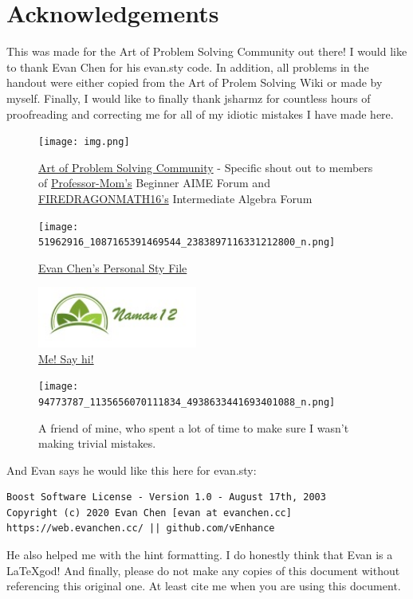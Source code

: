 \documentclass[11pt,titlepage]{scrartcl}
\begin{document}
\section{Acknowledgements}
This was made for the Art of Problem Solving Community out there! I would like to thank Evan Chen for his evan.sty code. In addition, all problems in the handout were either copied from the Art of Prolem Solving Wiki or made by myself. Finally, I would like to finally thank jsharmz for countless hours of proofreading and correcting me for all of my idiotic mistakes I have made here.
\begin{figure}[H]
    \centering
    \texttt{[image: img.png]}
    \caption*{\href{https://artofproblemsolving.com/community}{Art of Problem Solving Community} - Specific shout out to members of \href{https://artofproblemsolving.com/community/user/282934}{Professor-Mom's} Beginner AIME Forum and \href{https://artofproblemsolving.com/community/user/401703}{FIREDRAGONMATH16's} Intermediate Algebra Forum}
\end{figure}
\begin{figure}[H]
    \centering
    \texttt{[image: 51962916\_1087165391469544\_2383897116331212800\_n.png]}
    \caption*{\href{https://github.com/vEnhance/dotfiles/blob/master/texmf/tex/latex/evan/evan.sty}{Evan Chen's Personal Sty File}}
\end{figure}
\begin{figure}[H]
    \centering
    \includegraphics[height=20mm]{image000000.png.jpeg}
    \caption*{\href{https://realnaman12.github.io}{Me! Say hi!}}
\end{figure}
\begin{figure}[H]
    \centering
    \texttt{[image: 94773787\_1135656070111834\_4938633441693401088\_n.png]}
    \caption*{A friend of mine, who spent a lot of time to make sure I wasn't making trivial mistakes.}
\end{figure}
And Evan says he would like this here for evan.sty:
\begin{center}
\begin{verbatim}
Boost Software License - Version 1.0 - August 17th, 2003
Copyright (c) 2020 Evan Chen [evan at evanchen.cc]
https://web.evanchen.cc/ || github.com/vEnhance
\end{verbatim}
\end{center}
He also helped me with the hint formatting. I do honestly think that Evan is a \LaTeX god!\newline
And finally, please do not make any copies of this document without referencing this original one. At least cite me when you are using this document.
\clearpage
\end{document}
